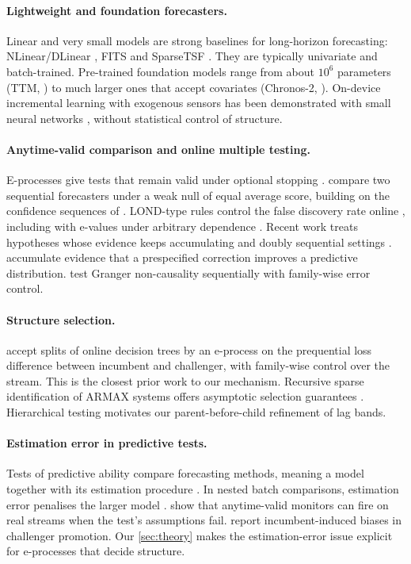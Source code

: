 \documentclass[11pt]{article}
\theoremstyle{remark}
\begin{document}
\paragraph{Lightweight and foundation forecasters.} Linear and very small models are strong baselines for long-horizon forecasting: NLinear/DLinear \citep{zeng2023dlinear}, FITS \citep{xu2024fits} and SparseTSF \citep{lin2024sparsetsf}. They are typically univariate and batch-trained. Pre-trained foundation models range from about $10^6$ parameters (TTM, \citealp{ekambaram2024ttm}) to much larger ones that accept covariates (Chronos-2, \citealp{ansari2025chronos2}). On-device incremental learning with exogenous sensors has been demonstrated with small neural networks \citep{larapinal2026iot}, without statistical control of structure.

\paragraph{Anytime-valid comparison and online multiple testing.} E-processes give tests that remain valid under optional stopping \citep{ramdas2023savi,grunwald2024safe}. \citet{choe2024comparing} compare two sequential forecasters under a weak null of equal average score, building on the confidence sequences of \citet{howard2021cs}. LOND-type rules control the false discovery rate online \citep{javanmard2018lond}, including with e-values under arbitrary dependence \citep{xu2024elond}. Recent work treats hypotheses whose evidence keeps accumulating \citep{deheide2026closure} and doubly sequential settings \citep{yao2025sava}. \citet{choi2026corrections} accumulate evidence that a prespecified correction improves a predictive distribution. \citet{jha2026granger} test Granger non-causality sequentially with family-wise error control.

\paragraph{Structure selection.} \citet{amoukou2026trees} accept splits of online decision trees by an e-process on the prequential loss difference between incumbent and challenger, with family-wise control over the stream. This is the closest prior work to our mechanism. Recursive sparse identification of ARMAX systems offers asymptotic selection guarantees \citep{armax2025sparse}. Hierarchical testing \citep{meinshausen2008,yekutieli2008} motivates our parent-before-child refinement of lag bands.

\paragraph{Estimation error in predictive tests.} Tests of predictive ability compare forecasting methods, meaning a model together with its estimation procedure \citep{giacomini2006}. In nested batch comparisons, estimation error penalises the larger model \citep{clark2007}. \citet{han2026martingale} show that anytime-valid monitors can fire on real streams when the test's assumptions fail. \citet{fernandez2026promotion} report incumbent-induced biases in challenger promotion. Our \cref{sec:theory} makes the estimation-error issue explicit for e-processes that decide structure.
\end{document}
